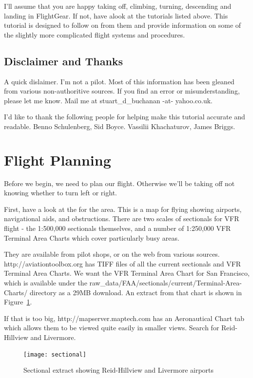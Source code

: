 I'll assume that you are happy taking off, climbing, turning, descending and landing in FlightGear. If not, have alook at the tutorials listed above. This tutorial is designed to follow on from them and provide information on some of the slightly more complicated flight systems and procedures.

\subsection{Disclaimer and Thanks}

A quick dislaimer. I'm not a pilot. Most of this information has been gleaned from various non-authoritive sources. If you find an error or misunderstanding, please let me know. Mail me at stuart\_d\_buchanan -at- yahoo.co.uk.

I'd like to thank the following people for helping make this tutorial accurate and readable. Benno Schulenberg, Sid Boyce. Vassilii Khachaturov, James Briggs.

\section{Flight Planning}

Before we begin, we need to plan our flight. Otherwise we'll be taking off not knowing whether to turn left or right.

First, have a look at the  for the area. This is a map for flying showing airports, navigational aids, and obstructions. There are two scales of sectionals for VFR flight - the 1:500,000 sectionals themselves, and a number of 1:250,000 VFR Terminal Area Charts which cover particularly busy areas.

They are available from pilot shops, or on the web from various sources. http://aviationtoolbox.org has TIFF files of all the current sectionals and VFR Terminal Area Charts. We want the VFR Terminal Area Chart for San Francisco, which is available under the raw\_data/FAA/sectionals/current/Terminal-Area-Charts/ directory as a 29MB download. An extract from that chart is shown in Figure~\ref{sectional}.

If that is too big, http://mapserver.maptech.com has an Aeronautical Chart tab which allows them to be viewed quite easily in smaller views. Search for Reid-Hillview and Livermore.

\begin{figure}[!htp]
\centering
\texttt{[image: sectional]}
\caption{Sectional extract showing Reid-Hillview and Livermore airports\label{sectional}}
\end{figure}


